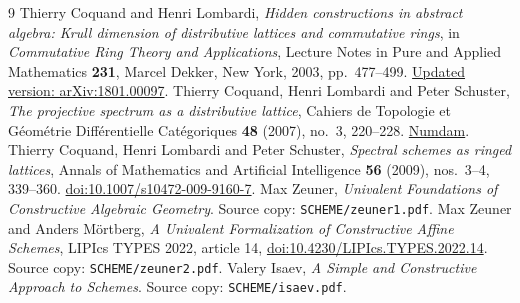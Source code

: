 \documentclass[11pt]{amsart}
\theoremstyle{definition}
\theoremstyle{remark}
\begin{document}
\begin{thebibliography}{9}
Thierry Coquand and Henri Lombardi,
\emph{Hidden constructions in abstract algebra: Krull dimension of
distributive lattices and commutative rings},
in \emph{Commutative Ring Theory and Applications},
Lecture Notes in Pure and Applied Mathematics \textbf{231},
Marcel Dekker, New York, 2003, pp.~477--499.
\href{https://arxiv.org/abs/1801.00097}{Updated version: arXiv:1801.00097}.
Thierry Coquand, Henri Lombardi and Peter Schuster,
\emph{The projective spectrum as a distributive lattice},
Cahiers de Topologie et G\'eom\'etrie Diff\'erentielle Cat\'egoriques
\textbf{48} (2007), no.~3, 220--228.
\href{https://www.numdam.org/item/CTGDC_2007__48_3_220_0/}{Numdam}.
Thierry Coquand, Henri Lombardi and Peter Schuster,
\emph{Spectral schemes as ringed lattices},
Annals of Mathematics and Artificial Intelligence \textbf{56} (2009),
nos.~3--4, 339--360.
\href{https://doi.org/10.1007/s10472-009-9160-7}{doi:10.1007/s10472-009-9160-7}.
Max Zeuner, \emph{Univalent Foundations of Constructive Algebraic
Geometry}. Source copy: \texttt{SCHEME/zeuner1.pdf}.
Max Zeuner and Anders M\"ortberg,
\emph{A Univalent Formalization of Constructive Affine Schemes},
LIPIcs TYPES 2022, article 14,
\href{https://doi.org/10.4230/LIPIcs.TYPES.2022.14}{doi:10.4230/LIPIcs.TYPES.2022.14}.
Source copy: \texttt{SCHEME/zeuner2.pdf}.
Valery Isaev, \emph{A Simple and Constructive Approach to Schemes}.
Source copy: \texttt{SCHEME/isaev.pdf}.
\end{thebibliography}
\end{document}

